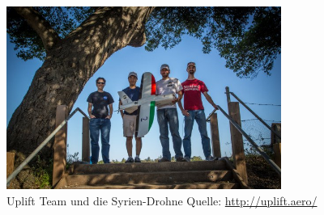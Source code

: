 \begin{figure}[H]
\centering
\includegraphics[width=0.8\textwidth] {images/SyriaUplift.jpg}
\caption{Uplift Team und die Syrien-Drohne Quelle: \protect\url{http://uplift.aero/}}
\label{fig:uplift}
\end{figure}


